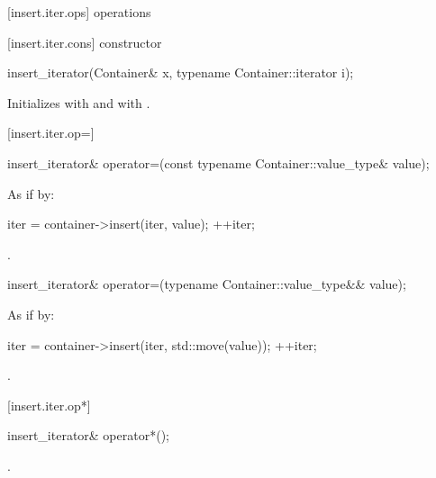 [insert.iter.ops]{ operations}

[insert.iter.cons]{ constructor}

%
\begin{itemdecl}
insert_iterator(Container& x, typename Container::iterator i);
\end{itemdecl}

\begin{itemdescr}
\pnum
\effects
Initializes
with  and
with .
\end{itemdescr}

[insert.iter.op=]{}

%
\begin{itemdecl}
insert_iterator& operator=(const typename Container::value_type& value);
\end{itemdecl}

\begin{itemdescr}
\pnum
\effects
As if by:
\begin{codeblock}
iter = container->insert(iter, value);
++iter;
\end{codeblock}

\pnum
\returns
{}.
\end{itemdescr}

%
\begin{itemdecl}
insert_iterator& operator=(typename Container::value_type&& value);
\end{itemdecl}

\begin{itemdescr}
\pnum
\effects
As if by:
\begin{codeblock}
iter = container->insert(iter, std::move(value));
++iter;
\end{codeblock}

\pnum
\returns
{}.
\end{itemdescr}

[insert.iter.op*]{}

%
\begin{itemdecl}
insert_iterator& operator*();
\end{itemdecl}

\begin{itemdescr}
\pnum
\returns
{}.
\end{itemdescr}

